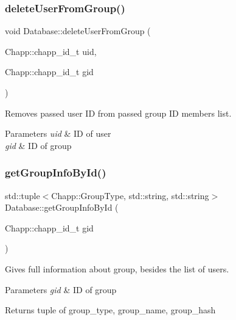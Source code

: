 \subsubsection{\texorpdfstring{delete\+User\+From\+Group()}{deleteUserFromGroup()}}
{\footnotesize\ttfamily void Database\+::delete\+User\+From\+Group (\begin{DoxyParamCaption}\item[{Chapp\+::chapp\+\_\+id\+\_\+t}]{uid,  }\item[{Chapp\+::chapp\+\_\+id\+\_\+t}]{gid }\end{DoxyParamCaption})}

Removes passed user ID from passed group ID members list. 
\begin{DoxyParams}{Parameters}
{\em uid} & ID of user \\
\hline
{\em gid} & ID of group \\
\hline
\end{DoxyParams}
\mbox{\label{class_database_a5a5714804e40ee468b2e5f1bccf8dc69}} 
\subsubsection{\texorpdfstring{get\+Group\+Info\+By\+Id()}{getGroupInfoById()}}
{\footnotesize\ttfamily std\+::tuple$<$Chapp\+::\+Group\+Type, std\+::string, std\+::string$>$ Database\+::get\+Group\+Info\+By\+Id (\begin{DoxyParamCaption}\item[{Chapp\+::chapp\+\_\+id\+\_\+t}]{gid }\end{DoxyParamCaption})}

Gives full information about group, besides the list of users. 
\begin{DoxyParams}{Parameters}
{\em gid} & ID of group \\
\hline
\end{DoxyParams}
\begin{DoxyReturn}{Returns}
tuple of group\+\_\+type, group\+\_\+name, group\+\_\+hash 
\end{DoxyReturn}
\mbox{\label{class_database_a286f48b8af7fa66023c6aba1b3e73127}} 
